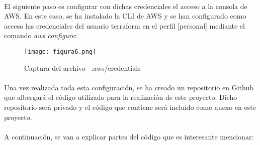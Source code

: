 \documentclass[../../memoria.tex]{subfiles}
\begin{document}
\paragraph{}
El siguiente paso es configurar con dichas credenciales el acceso a la consola de AWS. En este caso, se ha instalado la CLI de AWS \cite{awscli} y se han configurado como acceso las credenciales del usuario terraform en el perfil [personal] mediante el comando \textit{aws configure}:

\begin{figure}[H]
    \centering
    \texttt{[image: figura6.png]}
    \caption{Captura del archivo ~.aws/credentials}
    \label{fig:figura6}
\end{figure}

\paragraph{}
Una vez realizada toda esta configuración, se ha creado un repositorio en Github que albergará el código utilizado para la realización de este proyecto. Dicho repositorio será privado y el código que contiene será incluido como anexo en este proyecto.

\paragraph{}
A continuación, se van a explicar partes del código que es interesante mencionar:
\end{document}
